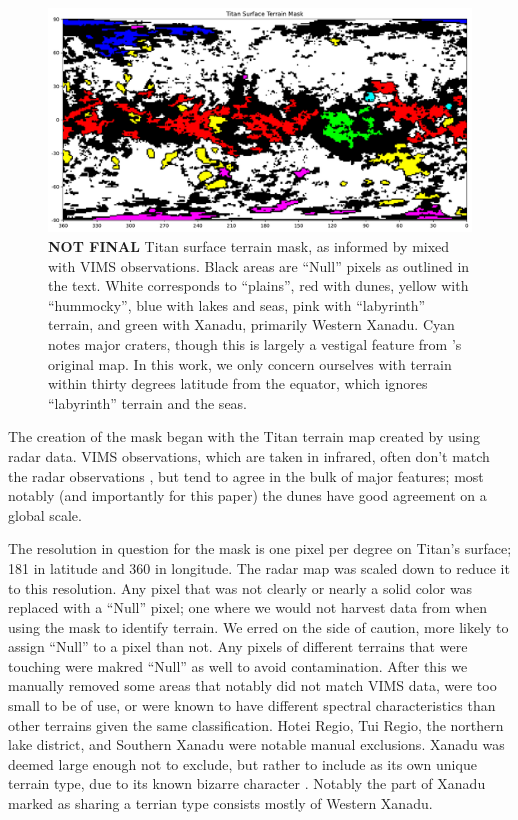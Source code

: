 \documentclass[twocolumn,linenumbers]{aastex631}
\begin{document}
\begin{figure}[htbp]
\includegraphics[scale = 0.25]{TitanSurfaceMask.pdf}
\centering
\caption{\textbf{\color{red} NOT FINAL \color{black}} Titan surface terrain mask, as informed by \cite{Lopes2020} mixed with VIMS observations. Black areas are ``Null'' pixels as outlined in the text. White corresponds to ``plains'', red with dunes, yellow with ``hummocky'', blue with lakes and seas, pink with ``labyrinth'' terrain, and green with Xanadu, primarily Western Xanadu. Cyan notes major craters, though this is largely a vestigal feature from \cite{Lopes2020}'s original map. In this work, we only concern ourselves with terrain within thirty degrees latitude from the equator, which ignores ``labyrinth'' terrain and the seas.}
\label{fig:6}
\end{figure}

The creation of the mask began with the Titan terrain map created by \cite{Lopes2020} using radar data. VIMS observations, which are taken in infrared, often don't match the radar observations \citep{Soderblom2007}, but tend to agree in the bulk of major features; most notably (and importantly for this paper) the dunes have good agreement on a global scale.

The resolution in question for the mask is one pixel per degree on Titan's surface; 181 in latitude and 360 in longitude. The radar map was scaled down to reduce it to this resolution. Any pixel that was not clearly or nearly a solid color was replaced with a ``Null'' pixel; one where we would not harvest data from when using the mask to identify terrain. We erred on the side of caution, more likely to assign ``Null'' to a pixel than not. Any pixels of different terrains that were touching were makred ``Null'' as well to avoid contamination. After this we manually removed some areas that notably did not match VIMS data, were too small to be of use, or were known to have different spectral characteristics than other terrains given the same classification. Hotei Regio, Tui Regio, the northern lake district, and Southern Xanadu were notable manual exclusions. Xanadu was deemed large enough not to exclude, but rather to include as its own unique terrain type, due to its known bizarre character \citep{Brown2011}. Notably the part of Xanadu marked as sharing a terrian type consists mostly of Western Xanadu.
\end{document}
